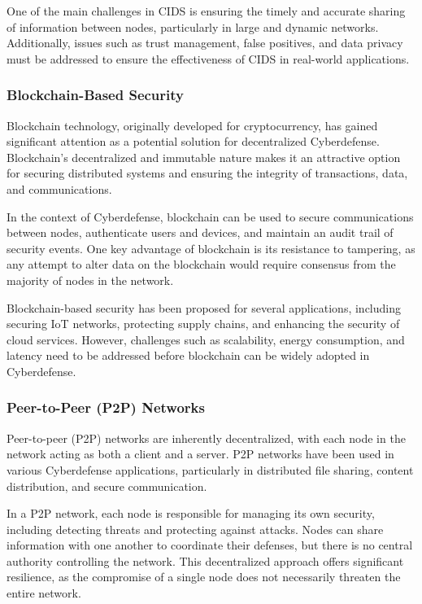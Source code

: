 One of the main challenges in CIDS is ensuring the timely and accurate sharing of information between nodes, particularly in large and dynamic networks. Additionally, issues such as trust management, false positives, and data privacy must be addressed to ensure the effectiveness of CIDS in real-world applications.

\subsubsection{Blockchain-Based Security}

Blockchain technology, originally developed for cryptocurrency, has gained significant attention as a potential solution for decentralized Cyberdefense. Blockchain's decentralized and immutable nature makes it an attractive option for securing distributed systems and ensuring the integrity of transactions, data, and communications.

In the context of Cyberdefense, blockchain can be used to secure communications between nodes, authenticate users and devices, and maintain an audit trail of security events. One key advantage of blockchain is its resistance to tampering, as any attempt to alter data on the blockchain would require consensus from the majority of nodes in the network.

Blockchain-based security has been proposed for several applications, including securing IoT networks, protecting supply chains, and enhancing the security of cloud services. However, challenges such as scalability, energy consumption, and latency need to be addressed before blockchain can be widely adopted in Cyberdefense.

\subsubsection{Peer-to-Peer (P2P) Networks}

Peer-to-peer (P2P) networks are inherently decentralized, with each node in the network acting as both a client and a server. P2P networks have been used in various Cyberdefense applications, particularly in distributed file sharing, content distribution, and secure communication.

In a P2P network, each node is responsible for managing its own security, including detecting threats and protecting against attacks. Nodes can share information with one another to coordinate their defenses, but there is no central authority controlling the network. This decentralized approach offers significant resilience, as the compromise of a single node does not necessarily threaten the entire network.

